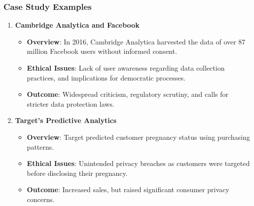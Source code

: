 \documentclass[aspectratio=169]{beamer}
\begin{document}
\begin{frame}[fragile]
    \frametitle{Case Study Examples}
    \begin{enumerate}
        \item \textbf{Cambridge Analytica and Facebook}
            \begin{itemize}
                \item \textbf{Overview}: In 2016, Cambridge Analytica harvested the data of over 87 million Facebook users without informed consent.
                \item \textbf{Ethical Issues}: Lack of user awareness regarding data collection practices, and implications for democratic processes.
                \item \textbf{Outcome}: Widespread criticism, regulatory scrutiny, and calls for stricter data protection laws.
            \end{itemize}
        \item \textbf{Target's Predictive Analytics}
            \begin{itemize}
                \item \textbf{Overview}: Target predicted customer pregnancy status using purchasing patterns.
                \item \textbf{Ethical Issues}: Unintended privacy breaches as customers were targeted before disclosing their pregnancy.
                \item \textbf{Outcome}: Increased sales, but raised significant consumer privacy concerns.
            \end{itemize}
    \end{enumerate}
\end{frame}
\end{document}
